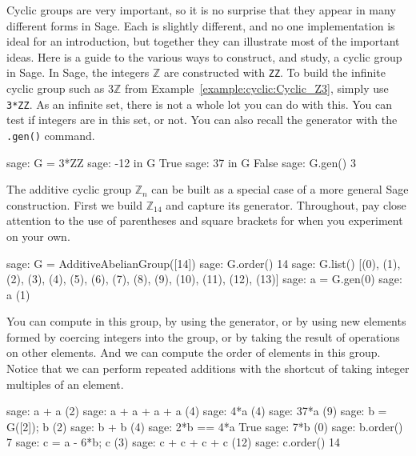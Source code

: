 Cyclic groups are very important, so it is no surprise that they appear in many different forms in Sage.  Each is slightly different, and no one implementation is ideal for an introduction, but together they can illustrate most of the important ideas.  Here is a guide to the various ways to construct, and study, a cyclic group in Sage.
%
%
In Sage, the integers $\mathbb Z$ are constructed with \verb?ZZ?.  To build the infinite cyclic group such as $3\mathbb Z$ from Example~\ref{example:cyclic:Cyclic_Z3}, simply use \verb?3*ZZ?.  As an infinite set, there is not a whole lot you can do with this.  You can test if integers are in this set, or not.  You can also recall the generator with the \verb?.gen()? command.
%
\begin{sageexample}
sage: G = 3*ZZ
sage: -12 in G
True
sage: 37 in G
False
sage: G.gen()
3
\end{sageexample}
%
%
The additive cyclic group $\mathbb Z_n$ can be built as a special case of a more general Sage construction.  First we build $\mathbb Z_{14}$ and capture its generator.  Throughout, pay close attention to the use of parentheses and square brackets for when you experiment on your own.
%
\begin{sageexample}
sage: G = AdditiveAbelianGroup([14])
sage: G.order()
14
sage: G.list()
[(0), (1), (2), (3), (4), (5), (6), (7),
 (8), (9), (10), (11), (12), (13)]
sage: a = G.gen(0)
sage: a
(1)
\end{sageexample}
%
You can compute in this group, by using the generator, or by using new elements formed by coercing integers into the group, or by taking the result of operations on other elements.  And we can compute the order of elements in this group.  Notice that we can perform repeated additions with the shortcut of taking integer multiples of an element.
%
\begin{sageexample}
sage: a + a
(2)
sage: a + a + a + a
(4)
sage: 4*a
(4)
sage: 37*a
(9)
sage: b = G([2]); b
(2)
sage: b + b
(4)
sage: 2*b == 4*a
True
sage: 7*b
(0)
sage: b.order()
7
sage: c = a - 6*b; c
(3)
sage: c + c + c + c
(12)
sage: c.order()
14
\end{sageexample}
